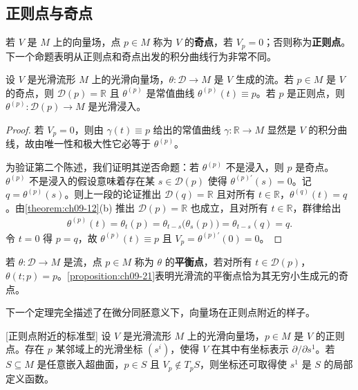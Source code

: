 \documentclass[../../main.tex]{subfiles}
\begin{document}
\subsection*{正则点与奇点}

若 $V$ 是 $M$ 上的向量场，点 $p\in M$ 称为 $V$ 的\textbf{奇点}，若 $V_p=0$；否则称为\textbf{正则点}。下一个命题表明从正则点和奇点出发的积分曲线行为非常不同。

\begin{proposition}\label{proposition:ch09-21}
设 $V$ 是光滑流形 $M$ 上的光滑向量场，$\theta\colon\mathscr{D}\to M$ 是 $V$ 生成的流。若 $p\in M$ 是 $V$ 的奇点，则 $\mathscr{D}(p)=\mathbb{R}$ 且 $\theta^{(p)}$ 是常值曲线 $\theta^{(p)}(t)\equiv p$。若 $p$ 是正则点，则 $\theta^{(p)}\colon\mathscr{D}(p)\to M$ 是光滑浸入。
\end{proposition}

\begin{proof}
若 $V_p=0$，则由 $\gamma(t)\equiv p$ 给出的常值曲线 $\gamma\colon\mathbb{R}\to M$ 显然是 $V$ 的积分曲线，故由唯一性和极大性它必等于 $\theta^{(p)}$。

为验证第二个陈述，我们证明其逆否命题：若 $\theta^{(p)}$ 不是浸入，则 $p$ 是奇点。$\theta^{(p)}$ 不是浸入的假设意味着存在某 $s\in\mathscr{D}(p)$ 使得 $\theta^{(p)\prime}(s)=0$。记 $q=\theta^{(p)}(s)$。则上一段的论证推出 $\mathscr{D}(q)=\mathbb{R}$ 且对所有 $t\in\mathbb{R}$，$\theta^{(q)}(t)=q$。由\cref{theorem:ch09-12}(b) 推出 $\mathscr{D}(p)=\mathbb{R}$ 也成立，且对所有 $t\in\mathbb{R}$，群律给出
\begin{align*}
\theta^{(p)}(t)=\theta_t(p)=\theta_{t-s}\bigl(\theta_s(p)\bigr)=\theta_{t-s}(q)=q.
\end{align*}
令 $t=0$ 得 $p=q$，故 $\theta^{(p)}(t)\equiv p$ 且 $V_p=\theta^{(p)\prime}(0)=0$。
\end{proof}

若 $\theta\colon\mathscr{D}\to M$ 是流，点 $p\in M$ 称为 $\theta$ 的\textbf{平衡点}，若对所有 $t\in\mathscr{D}(p)$，$\theta(t;p)=p$。\cref{proposition:ch09-21}表明光滑流的平衡点恰为其无穷小生成元的奇点。

下一个定理完全描述了在微分同胚意义下，向量场在正则点附近的样子。

\begin{theorem}\label{theorem:ch09-22}[正则点附近的标准型]
设 $V$ 是光滑流形 $M$ 上的光滑向量场，$p\in M$ 是 $V$ 的正则点。存在 $p$ 某邻域上的光滑坐标 $(s^i)$，使得 $V$ 在其中有坐标表示 $\partial/\partial s^1$。若 $S\subseteq M$ 是任意嵌入超曲面，$p\in S$ 且 $V_p\notin T_pS$，则坐标还可取得使 $s^1$ 是 $S$ 的局部定义函数。
\end{theorem}
\end{document}
